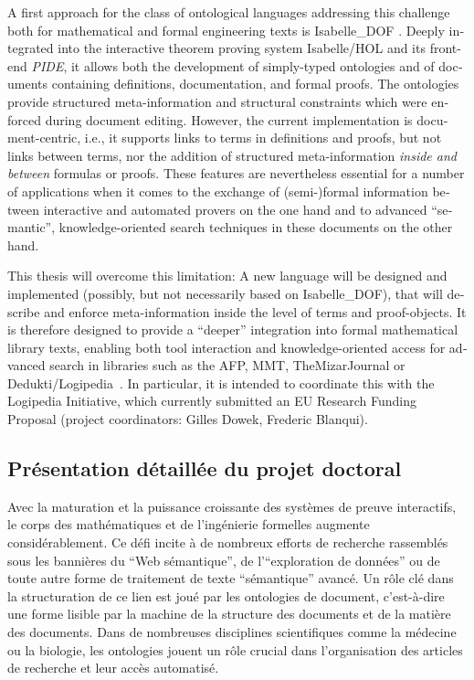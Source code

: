 \documentclass[a4paper,10pt]{article}
\begin{document}
\begin{english}
A first approach for the class of ontological languages
addressing this challenge
both for mathematical and formal engineering texts is
Isabelle\_DOF
\cite{
  Brucker-ea.Using-CICM18,
  BruckerWolff.Design-SEFM19,
  BruckerWolff.Certif-IFM19%
}.
Deeply integrated into the interactive theorem proving system Isabelle/HOL
and its front-end \emph{PIDE},
it allows both the development of simply-typed ontologies
and of documents containing definitions, documentation,
and formal proofs.
The ontologies provide structured meta-information and structural constraints
which were enforced during document editing.
However, the current implementation is document-centric,
i.e., it supports links to terms in definitions and proofs,
but not links between terms, nor the addition of structured meta-information
\emph{inside and between} formulas or proofs.
These features are nevertheless essential for a number of applications
when it comes to the exchange of (semi-)formal information
between interactive and automated provers on the one hand
and to advanced \enquote{semantic}, knowledge-oriented search techniques
in these documents on the other hand.

This thesis will overcome this limitation:
A new language will be designed and implemented
(possibly, but not necessarily based on Isabelle\_DOF),
that will describe and enforce meta-information
inside the level of terms and proof-objects.
It is therefore designed to provide a \enquote{deeper} integration
into formal mathematical library texts,
enabling both tool interaction and knowledge-oriented access
for advanced search in libraries such as the AFP, MMT, TheMizarJournal
or Dedukti/Logipedia~\cite{afp,mmt,TheMizarJournal,dedukti}.
In particular, it is intended to coordinate this
with the Logipedia Initiative,
which currently submitted an EU Research Funding Proposal
(project coordinators: Gilles Dowek, Frederic Blanqui).

\end{english}

\subsection*{Présentation détaillée du projet doctoral}

Avec la maturation et la puissance croissante
des systèmes de preuve interactifs,
le corps des mathématiques et de l'ingénierie formelles augmente considérablement.
Ce défi incite à de nombreux efforts de recherche
rassemblés sous les bannières du \enquote{Web sémantique},
de l'\enquote{exploration de données}
ou de toute autre forme de traitement de texte \enquote{sémantique} avancé.
Un rôle clé dans la structuration de ce lien est joué
par les ontologies de document,
c'est-à-dire une forme lisible par la machine de la structure des documents
et de la matière des documents.
Dans de nombreuses disciplines scientifiques comme la médecine ou la biologie,
les ontologies jouent un rôle crucial
dans l'organisation des articles de recherche et leur accès automatisé.
\end{document}
